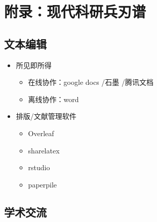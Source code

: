 \documentclass[]{book}
\providecommand{\tightlist}{%
  \setlength{\itemsep}{0pt}\setlength{\parskip}{0pt}}
\begin{document}
\chapter*{附录：现代科研兵刃谱}

\section{文本编辑}

\begin{itemize}
\tightlist
\item
  所见即所得

  \begin{itemize}
  \tightlist
  \item
    在线协作：google docs /石墨 /腾讯文档
  \item
    离线协作：word
  \end{itemize}
\item
  排版/文献管理软件

  \begin{itemize}
  \tightlist
  \item
    Overleaf
  \item
    sharelatex
  \item
    rstudio
  \item
    paperpile
  \end{itemize}
\end{itemize}

\section{学术交流}
\end{document}
